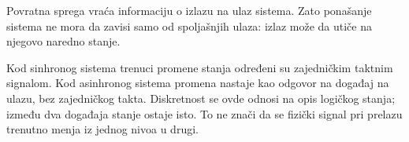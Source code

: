 
Povratna sprega vraća informaciju o izlazu na ulaz sistema. Zato ponašanje sistema ne mora da zavisi samo od spoljašnjih ulaza: izlaz može da utiče na njegovo naredno stanje.

Kod sinhronog sistema trenuci promene stanja određeni su zajedničkim taktnim signalom. Kod asinhronog sistema promena nastaje kao odgovor na događaj na ulazu, bez zajedničkog takta. Diskretnost se ovde odnosi na opis logičkog stanja; između dva događaja stanje ostaje isto. To ne znači da se fizički signal pri prelazu trenutno menja iz jednog nivoa u drugi.
